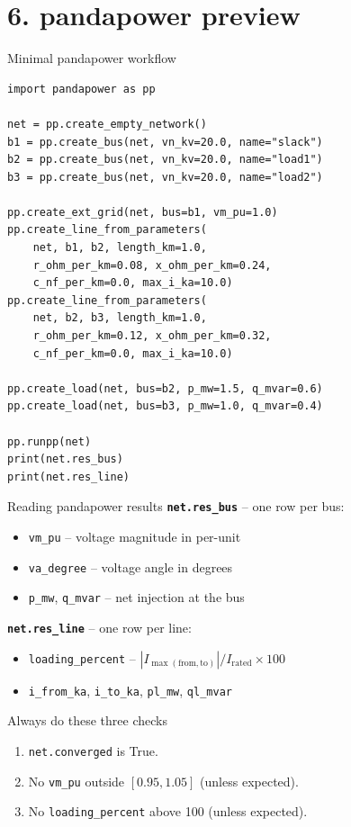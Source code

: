 \documentclass[aspectratio=169,10pt]{beamer}
\newcommand{\code}[1]{\texttt{#1}}
\begin{document}
\section*{6. pandapower preview}

\begin{frame}[fragile]{Minimal pandapower workflow}
\begin{lstlisting}
import pandapower as pp

net = pp.create_empty_network()
b1 = pp.create_bus(net, vn_kv=20.0, name="slack")
b2 = pp.create_bus(net, vn_kv=20.0, name="load1")
b3 = pp.create_bus(net, vn_kv=20.0, name="load2")

pp.create_ext_grid(net, bus=b1, vm_pu=1.0)
pp.create_line_from_parameters(
    net, b1, b2, length_km=1.0,
    r_ohm_per_km=0.08, x_ohm_per_km=0.24,
    c_nf_per_km=0.0, max_i_ka=10.0)
pp.create_line_from_parameters(
    net, b2, b3, length_km=1.0,
    r_ohm_per_km=0.12, x_ohm_per_km=0.32,
    c_nf_per_km=0.0, max_i_ka=10.0)

pp.create_load(net, bus=b2, p_mw=1.5, q_mvar=0.6)
pp.create_load(net, bus=b3, p_mw=1.0, q_mvar=0.4)

pp.runpp(net)
print(net.res_bus)
print(net.res_line)
\end{lstlisting}
\end{frame}

\begin{frame}{Reading pandapower results}
\textbf{\code{net.res\_bus}} -- one row per bus:
\begin{itemize}
  \item \code{vm\_pu} -- voltage magnitude in per-unit
  \item \code{va\_degree} -- voltage angle in degrees
  \item \code{p\_mw}, \code{q\_mvar} -- net injection at the bus
\end{itemize}
\textbf{\code{net.res\_line}} -- one row per line:
\begin{itemize}
  \item \code{loading\_percent} -- $|I_{\max(\text{from},\text{to})}| / I_{\text{rated}} \times 100$
  \item \code{i\_from\_ka}, \code{i\_to\_ka}, \code{pl\_mw}, \code{ql\_mvar}
\end{itemize}
\vspace{0.5em}
\begin{alertblock}{Always do these three checks}
\begin{enumerate}
  \item \code{net.converged} is True.
  \item No \code{vm\_pu} outside $[0.95, 1.05]$ (unless expected).
  \item No \code{loading\_percent} above 100 (unless expected).
\end{enumerate}
\end{alertblock}
\end{frame}
\end{document}
